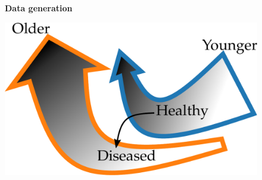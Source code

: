 \documentclass[twocolumn]{article}
\begin{document}
\begin{figure}[t!]
  \centering
  \begin{minipage}{.44\textwidth}
    \centerline{\sffamily\bfseries Data generation}

    \hspace*{.05\linewidth}%
    \includegraphics[width=.6\textwidth]{parabolas_schema.pdf}


\end{minipage}
\end{figure}
\end{document}
